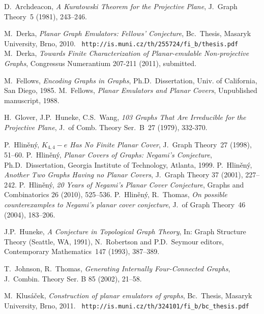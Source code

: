 \documentclass[envcountsect,envcountsame]{llncs}
\begin{document}
\begin{thebibliography}{99}


   D.~Archdeacon, {\em A Kuratowski Theorem for the Projective Plane\/},
   J.~Graph Theory~5 (1981), 243--246.


   M.~Derka, {\em Planar Graph Emulators: Fellows' Conjecture},
   Bc.~Thesis, Masaryk University, Brno, 2010.
	~\verb#http://is.muni.cz/th/255724/fi_b/thesis.pdf#
   M.~Derka, {\em Towards Finite Characterization of
	Planar-emulable Non-projective Graphs},
   Congressus Numerantium 207-211 (2011), submitted.

   M.~Fellows, {\em Encoding Graphs in Graphs},
   Ph.D.~Dissertation, Univ. of California, San Diego, 1985.
   M.~Fellows, {\em Planar Emulators and Planar Covers},
   Unpublished manuscript, 1988.

    H.~Glover, J.P.~Huneke, C.S.~Wang,
    {\em 103 Graphs That Are Irreducible for the Projective Plane},
    J.~of Comb. Theory Ser.~B~27 (1979), 332-370.

   P.~Hlin\v en\'y, {\em $K_{4,4}-e$ Has No Finite Planar Cover},
   J.~Graph Theory~27 (1998), 51--60.
   P.~Hlin\v en\'y, {\em Planar Covers of Graphs: Negami's Conjecture},
   Ph.D.~Dissertation, Georgia Institute of Technology, Atlanta, 1999.
   P.~Hlin\v en\'y, {\em Another Two Graphs Having no Planar Covers},
   J.~Graph Theory 37 (2001), 227--242.
   P.~Hlin\v en\'y, {\em 20 Years of Negami's Planar Cover Conjecture},
   Graphs and Combinatorics 26 (2010), 525--536.
   P.~Hlin\v en\'y, R.~Thomas,
   {\em On possible counterexamples to Negami's planar cover conjecture},
    J.~of Graph Theory~46 (2004), 183--206.

    J.P.~Huneke, {\em A Conjecture in Topological Graph Theory\/},
    In: Graph Structure Theory (Seattle, WA, 1991),
    N.~Robertson and P.D.~Seymour editors, Contemporary Mathematics~147
    (1993), 387--389.

    T.~Johnson, R.~Thomas, {\em Generating Internally Four-Connected Graphs},
    J.~Combin. Theory Ser. B 85 (2002), 21--58.



   M.~Klus\'a\v cek, {\em Construction of planar emulators of graphs},
   Bc.~Thesis, Masaryk University, Brno, 2011.
	~\verb#http://is.muni.cz/th/324101/fi_b/bc_thesis.pdf#




\end{thebibliography}
\end{document}
